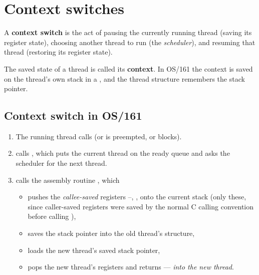 \section{Context switches}

\begin{definition}
A \textbf{context switch} is the act of pausing the currently running thread (saving its
register state), choosing another thread to run (the \emph{scheduler}), and resuming that thread
(restoring its register state).
\end{definition}

The saved state of a thread is called its \textbf{context}. In OS/161 the context is saved on the
thread's own stack in a , and the thread structure remembers the stack
pointer.

\subsection*{Context switch in OS/161}
\begin{enumerate}
  \item The running thread calls  (or is preempted, or blocks).
  \item {} calls , which puts the current
    thread on the ready queue and asks the scheduler for the next thread.
  \item {} calls the assembly routine , which
    \begin{itemize}
      \item pushes the \emph{callee-saved} registers --, , 
        onto the current stack (only these, since caller-saved registers were saved by the
        normal C calling convention before calling ),
      \item saves the stack pointer into the old thread's structure,
      \item loads the new thread's saved stack pointer,
      \item pops the new thread's registers and returns --- \emph{into the new thread}.
    \end{itemize}
\end{enumerate}

